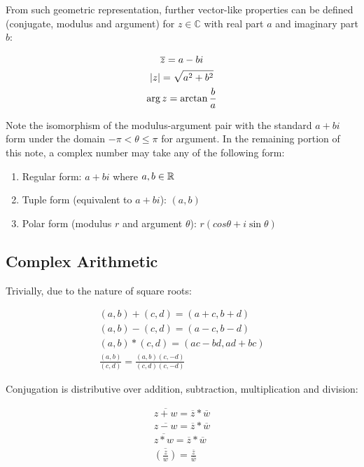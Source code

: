 \documentclass[12pt]{article}
\begin{document}
	From such geometric representation, further vector-like properties can be defined (conjugate, modulus and argument) for $z \in \mathbb{C}$ with real part $a$ and imaginary part $b$:
	
	\begin{gather*}
		\overline{z} = a - bi \\
		\lvert z \rvert = \sqrt{a^2 + b^2} \\
		\arg z = \arctan \frac{b}{a}
	\end{gather*}
	
	Note the isomorphism of the modulus-argument pair with the standard $a + bi$ form under the domain $-\pi < \theta \leq \pi$ for argument. In the remaining portion of this note, a complex number may take any of the following form:
	
	\begin{enumerate}
		\item Regular form: $a + bi$ where $a, b \in \mathbb{R}$
		\item Tuple form (equivalent to $a + bi$): $(a, b)$
		\item Polar form (modulus $r$ and argument $\theta$): $r(cos \theta + i \sin \theta)$
	\end{enumerate}
	
	\subsection{Complex Arithmetic}
	
	Trivially, due to the nature of square roots:
	
	\begin{gather*}
		(a, b) + (c, d) = (a + c, b + d) \\
		(a, b) - (c, d) = (a - c, b - d) \\
		(a, b) * (c, d) = (ac - bd, ad + bc) \\
		\frac{(a, b)}{(c, d)} = \frac{(a, b)(c, -d)}{(c, d)(c, -d)}
	\end{gather*}
	
	Conjugation is distributive over addition, subtraction, multiplication and division:
	
	\begin{gather*}
		\overline{z + w} = \overline{z} * \overline{w} \\
		\overline{z - w} = \overline{z} * \overline{w} \\
		\overline{z * w} = \overline{z} * \overline{w} \\
		\overline{\left(\frac{z}{w}\right)} = \frac{\overline{z}}{\overline{w}}
	\end{gather*}
	
\end{document}
